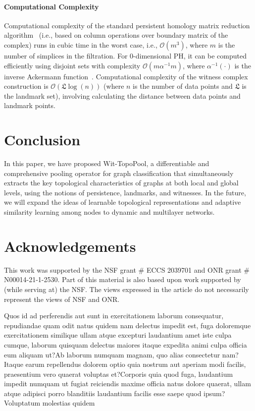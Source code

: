 \documentclass[letterpaper]{article} %
\begin{document}
\paragraph{Computational Complexity} Computational complexity of the standard persistent homology matrix reduction algorithm~\cite{edelsbrunner2000topological} (i.e., based on column operations over boundary matrix of the complex) runs in cubic time in the worst case, i.e., $\mathcal{O}(m^3)$, where $m$ is the number of simplices in the filtration. For 0-dimensional PH, it can be computed efficiently using disjoint sets with complexity $\mathcal{O}(m\alpha^{-1}m)$, where $\alpha^{-1}(\cdot)$ is the inverse Ackermann function~\cite{cormen2022introduction}. Computational complexity of the witness complex construction is $\mathcal{O}(\mathfrak{L} \log{(n)})$ (where $n$ is the number of data points and $\mathfrak{L}$ is the landmark set), involving calculating the distance between data points and landmark points.

\section{Conclusion}
In this paper, we have proposed Wit-TopoPool, a differentiable and comprehensive pooling operator for graph classification that simultaneously extracts the key topological characteristics of graphs at both local and global levels, using the notions of persistence, landmarks, and witnesses. In the future, we will expand the ideas of learnable topological representations and adaptive similarity learning among nodes to dynamic and multilayer networks.
\section{Acknowledgements}
This work was supported by the NSF grant \# ECCS 2039701 and ONR grant \# N00014-21-1-2530. Part of this material is also based upon work supported by (while serving at) the NSF. The views expressed in the article do not necessarily represent the views of NSF and ONR.


Quos id ad perferendis aut sunt in exercitationem laborum consequatur, repudiandae quam odit natus quidem nam delectus impedit est, fuga doloremque exercitationem similique ullam atque excepturi laudantium amet iste culpa cumque, laborum quisquam delectus maiores itaque expedita animi culpa officia eum aliquam ut?Ab laborum numquam magnam, quo alias consectetur nam?Itaque earum repellendus dolorem optio quia nostrum aut aperiam modi facilis, praesentium vero quaerat voluptas et?Corporis quia quod fuga, laudantium impedit numquam ut fugiat reiciendis maxime officia natus dolore quaerat, ullam atque adipisci porro blanditiis laudantium facilis esse saepe quod ipsum?Voluptatum molestias quidem

\end{document}
